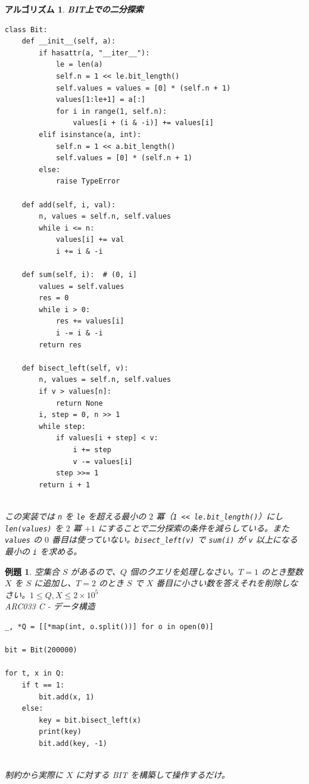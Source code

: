 \documentclass[12pt, a4j]{ltjsarticle}
\newtheorem{alg}[thm]{アルゴリズム}
\newtheorem{exm}[thm]{例題}
\begin{document}
\begin{alg} {\bf BIT上での二分探索}\\\upshape
\begin{lstlisting}
class Bit:
    def __init__(self, a):
        if hasattr(a, "__iter__"):
            le = len(a)
            self.n = 1 << le.bit_length()
            self.values = values = [0] * (self.n + 1)
            values[1:le+1] = a[:]
            for i in range(1, self.n):
                values[i + (i & -i)] += values[i]
        elif isinstance(a, int):
            self.n = 1 << a.bit_length()
            self.values = [0] * (self.n + 1)
        else:
            raise TypeError

    def add(self, i, val):
        n, values = self.n, self.values
        while i <= n:
            values[i] += val
            i += i & -i

    def sum(self, i):  # (0, i]
        values = self.values
        res = 0
        while i > 0:
            res += values[i]
            i -= i & -i
        return res

    def bisect_left(self, v):
        n, values = self.n, self.values
        if v > values[n]:
            return None
        i, step = 0, n >> 1
        while step:
            if values[i + step] < v:
                i += step
                v -= values[i]
            step >>= 1
        return i + 1
\end{lstlisting}\quad\\
この実装では \lstinline{n} を \lstinline{le} を超える最小の $2$ 冪（\lstinline{1 << le.bit_length()}）にし\lstinline{len(values)} を $2$ 冪 $+ 1$ にすることで二分探索の条件を減らしている。また\lstinline{values} の $0$ 番目は使っていない。\lstinline{bisect_left(v)} で \lstinline{sum(i)} が \lstinline{v} 以上になる最小の \lstinline{i} を求める。
\end{alg}

\newpage

\begin{exm} \upshape 空集合 $S$ があるので、$Q$ 個のクエリを処理しなさい。$T=1$ のとき整数 $X$ を $S$ に追加し、$T=2$ のとき $S$ で $X$ 番目に小さい数を答えそれを削除しなさい。$1\le Q,X\le 2\times10^5$\\ARC033 C - データ構造\label{ARC033C}\\
\begin{lstlisting}
_, *Q = [[*map(int, o.split())] for o in open(0)]

bit = Bit(200000)

for t, x in Q:
    if t == 1:
        bit.add(x, 1)
    else:
        key = bit.bisect_left(x)
        print(key)
        bit.add(key, -1)
\end{lstlisting}\quad\\
制約から実際に $X$ に対する BIT を構築して操作するだけ。
\end{exm}
\end{document}
